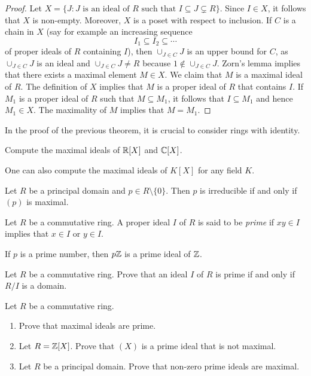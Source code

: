\begin{proof}
	Let $X=\{J:J\text{ is an ideal of $R$ such that }I\subseteq J\subsetneq R\}$.
	Since $I\in X$, it follows that $X$ is non-empty. Moreover, $X$ is a poset
	with respect to inclusion. If $C$ is a chain in $X$ (say for example
	an increasing sequence
	\[
	I_1\subseteq I_2\subseteq\cdots
	\]
	of proper ideals of $R$ containing $I$), then 
	$\cup_{J\in C}J$ is an upper bound for $C$, as $\cup_{J\in C}J$ is an ideal and
	$\cup_{J\in C}J\ne R$ because $1\not\in\cup_{J\in C}J$. 	Zorn's lemma implies that
	there exists a maximal element $M\in X$. We claim that $M$ is a maximal ideal of $R$. The definition
	of $X$ implies that $M$ is a proper ideal of $R$ that contains $I$. If $M_1$ is a proper ideal of $R$
	such that $M\subseteq M_1$, it follows that $I\subseteq M_1$ and hence $M_1\in X$. The maximality
	of $M$ implies that $M=M_1$.  
\end{proof}

In the proof of the previous theorem, it is crucial to consider rings with 
identity. 

\begin{exercise}
	Compute the maximal ideals of $\mathbb{R}[X]$ and $\mathbb{C}[X]$. 	
\end{exercise}

One can also compute the maximal ideals of $K[X]$ for any field $K$. 

\begin{exercise}
	Let $R$ be a principal domain and $p\in R\setminus\{0\}$. 
	Then $p$ is irreducible 
	if and only if $(p)$ is maximal.	
\end{exercise}

\begin{definition}
Let $R$ be a commutative ring. A proper ideal $I$ of $R$ is said to be
\emph{prime} if $xy\in I$ implies that $x\in I$ or $y\in I$. 
\end{definition}

If $p$ is a prime number, then $p\mathbb{Z}$ is a prime ideal of $\mathbb{Z}$.

\begin{exercise}
\label{xca:prime<=>domain}
    Let $R$ be a commutative ring. 
    Prove that an ideal $I$ of $R$ is prime if and only if $R/I$ is a domain. 
\end{exercise}

\begin{exercise}
Let $R$ be a commutative ring. 
\label{xca:maximal=>prime}
\begin{enumerate}
    \item Prove that maximal ideals are prime. 
    \item Let $R=\mathbb{Z}[X]$. Prove that $(X)$ is a prime ideal that is not maximal.
    \item Let $R$ be a principal domain. Prove that non-zero 
    prime ideals are maximal. 
\end{enumerate}
\end{exercise}

